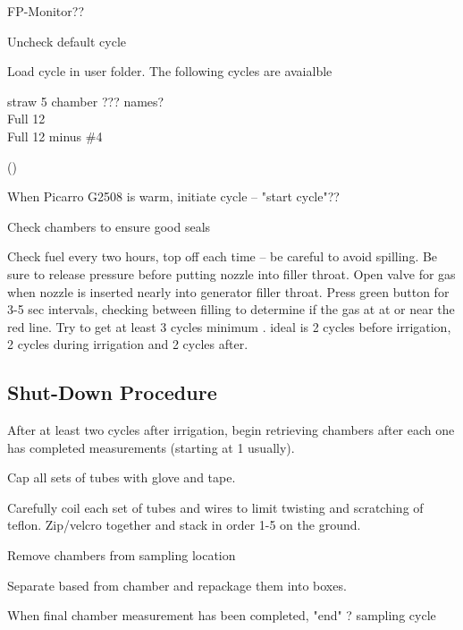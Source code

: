 \documentclass[12pt]{../SOP3}\usepackage[]{graphicx}\usepackage[]{color}
\begin{document}
\NP FP-Monitor??
                               
\NP Uncheck default cycle
                               
\NP Load cycle in user folder. The following cycles are avaialble 

\begin{description}
  \item[straw 5 chamber ??? names?]
  \item[Full 12]
  \item[Full 12 minus \#4]
\end{description}
()
                               
\NP When Picarro G2508 is warm, initiate cycle -- "start cycle"??
                               
\NP Check chambers to ensure good seals
                               
\NP Check fuel every two hours, top off each time -- be careful to avoid spilling. Be sure to release pressure before putting nozzle into filler throat. Open valve for gas when nozzle is inserted nearly into generator filler throat. Press green button for 3-5 sec intervals, checking between filling to determine if the gas at at or near the red line.
                               Try to get at least 3 cycles minimum . ideal is 2 cycles before irrigation, 2 cycles during irrigation and 2 cycles after. 
                               
\subsection*{Shut-Down Procedure}
                               
\NP After at least two cycles after irrigation, begin retrieving chambers after each one has completed measurements (starting at 1 usually).
                               
\NP Cap all sets of tubes with glove and tape.
                               
\NP Carefully coil each set of tubes and wires to limit twisting and scratching of teflon. Zip/velcro together and stack in order 1-5 on the ground. 
                               
\NP Remove chambers from sampling location
                               
\NP Separate based from chamber and repackage them into boxes.
                               
\NP When final chamber measurement has been completed, "end" ? sampling cycle
                               
\end{document}
